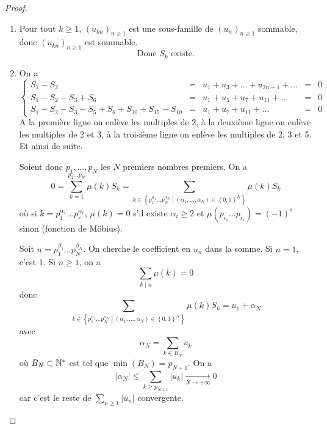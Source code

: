 \documentclass[12pt]{article}
\begin{document}
\begin{proof}
	\phantom{}
	\begin{enumerate}
		\item Pour tout $k\geqslant1$, $\left(u_{kn}\right)_{n\geqslant1}$ est une sous-famille de $\left(u_{n}\right)_{n\geqslant1}$ sommable, donc $\left(u_{kn}\right)_{n\geqslant1}$ est sommable.
		\begin{equation*}\boxed{\text{Donc }S_{k}\text{ existe.}}\end{equation*}

		\item On a 
		\begin{equation*}
		\left\{
			\begin{aligned}
				S_{1}-S_{2} &= &u_{1}+u_{3}+\dots+u_{2n+1}+\dots &= &0\\
				S_{1}-S_{2}-S_{3}+S_{6} &= &u_{1}+u_{5}+u_{7}+u_{11}+\dots &= &0\\
				S_{1}-S_{2}-S_{3}-S_{5}+S_{6}+S_{10}+S_{15}-S_{10} &= &u_{1}+u_{7}+u_{11}+\dots &= &0
			\end{aligned}
		\right.
		\end{equation*}
		A la première ligne on enlève les multiples de 2, à la deuxième ligne on enlève les multiples de 2 et 3, à la troisième ligne on enlève les multiples de 2, 3 et 5. Et ainsi de suite.

		Soient donc $p_{1},\dots,p_{N}$ les $N$ premiers nombres premiers. On a 
		\begin{equation*}0=\sum_{k=1}^{p_{1}\dots p_{N}}\mu(k)S_{k}=\sum_{k\in\left\{p_{1}^{\alpha_{1}}\dots p_{N}^{\alpha_{N}}\middle|\left(\alpha_{1},\dots,\alpha_{N}\right)\in\left\{0,1\right\}^{N}\right\}}\mu(k)S_{k}\end{equation*}
		où si $k=p_{1}^{\alpha_{1}}\dots p_{r}^{\alpha_{r}}$, $\mu(k)=0$ s'il existe $\alpha_{i}\geqslant 2$ et $\mu\left(p_{i_{1}}\dots p_{i_{s}}\right)=\left(-1\right)^{s}$ sinon (fonction de Möbius).

		Soit $n=p_{1}^{\beta_{1}}\dots p_{N}^{\beta_{N}}$. On cherche le coefficient en $u_{n}$ dans la somme. Si $n=1$, c'est 1. Si $n\geqslant 1$, on a 
		\begin{equation*}\sum_{k\mid n}\mu(k)=0\end{equation*}
		donc 
		\begin{equation*}\sum_{k\in\left\{p_{1}^{\alpha_{1}}\dots p_{N}^{\alpha_{N}}\middle|\left(\alpha_{1},\dots,\alpha_{N}\right)\in\left\{0,1\right\}^{N}\right\}}\mu(k)S_{k}=u_{1}+\alpha_{N}\end{equation*}
		avec 
		\begin{equation*}\alpha_{N}=\sum_{k\in B_{N}}u_{k}\end{equation*}
		où $B_{N}\subset\mathbb{N}^{*}$ est tel que $\min\left(B_{N}\right)=p_{N+1}$. On a 
		\begin{equation*}\left\lvert \alpha_{N}\right\rvert\leqslant\sum_{k\geqslant p_{N+1}}\left\lvert u_{k}\right\rvert\xrightarrow[N\to+\infty]{}0\end{equation*}
		car c'est le reste de $\sum_{n\geqslant 1}\left\lvert u_n\right\rvert$ convergente.


\end{enumerate}
\end{proof}
\end{document}
